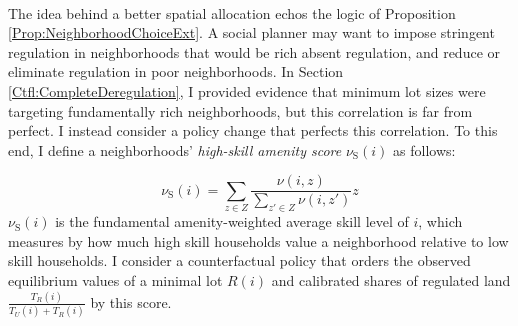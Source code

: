 \documentclass[12pt]{article}
\begin{document}
\paragraph*{}
The idea behind a better spatial allocation echos the logic of Proposition \ref{Prop:NeighborhoodChoiceExt}. A social planner may want to impose stringent regulation in neighborhoods that would be rich absent regulation, and reduce or eliminate regulation in poor neighborhoods. In Section \ref{Ctfl:CompleteDeregulation}, I provided evidence that minimum lot sizes were targeting fundamentally rich neighborhoods, but this correlation is far from perfect. I instead consider a policy change that perfects this correlation. To this end, I define a neighborhoods' \textit{high-skill amenity score} $\nu_{\text{S}}(i)$ as follows:


\begin{equation}
	\nu_{\text{S}}(i) = \sum_{z \in Z}\frac{\nu(i, z)}{\sum_{z' \in Z}\nu(i, z')}z
\end{equation}
$\nu_{\text{S}}(i)$ is the fundamental amenity-weighted average skill level of $i$, which measures by how much high skill households value a neighborhood relative to low skill households. I consider a counterfactual policy that orders the observed equilibrium values of a minimal lot $R(i)$ and calibrated shares of regulated land $\frac{T_{R}(i)}{T_{U}(i) + T_{R}(i)}$ by this score. 
\end{document}
